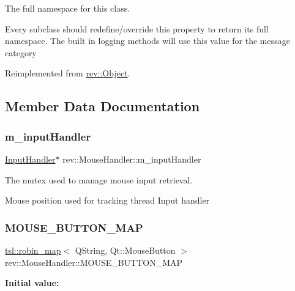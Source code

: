 The full namespace for this class. 

Every subclass should redefine/override this property to return its full namespace. The built in logging methods will use this value for the message category 

Reimplemented from \mbox{\hyperlink{classrev_1_1_object_aaeb638d3e10f361c56c211a318a27f3d}{rev\+::\+Object}}.



\subsection{Member Data Documentation}
\mbox{\label{classrev_1_1_mouse_handler_a3ea7f25610b26d1234e1789d4c41c29b}} 
\subsubsection{\texorpdfstring{m\_inputHandler}{m\_inputHandler}}
{\footnotesize\ttfamily \mbox{\hyperlink{classrev_1_1_input_handler}{Input\+Handler}}$\ast$ rev\+::\+Mouse\+Handler\+::m\+\_\+input\+Handler\hspace{0.3cm}{\ttfamily [protected]}}



The mutex used to manage mouse input retrieval. 

Mouse position used for tracking thread Input handler \mbox{\label{classrev_1_1_mouse_handler_a1fb8ce799a2b22e2ce58268a62d8ac5e}} 
\subsubsection{\texorpdfstring{MOUSE\_BUTTON\_MAP}{MOUSE\_BUTTON\_MAP}}
{\footnotesize\ttfamily \mbox{\hyperlink{classtsl_1_1robin__map}{tsl\+::robin\+\_\+map}}$<$ Q\+String, Qt\+::\+Mouse\+Button $>$ rev\+::\+Mouse\+Handler\+::\+M\+O\+U\+S\+E\+\_\+\+B\+U\+T\+T\+O\+N\+\_\+\+M\+AP\hspace{0.3cm}{\ttfamily [static]}}

{\bfseries Initial value\+:}
\begin{DoxyCode}{0}
\DoxyCodeLine{= \{}
\DoxyCodeLine{\}}

\end{DoxyCode}



